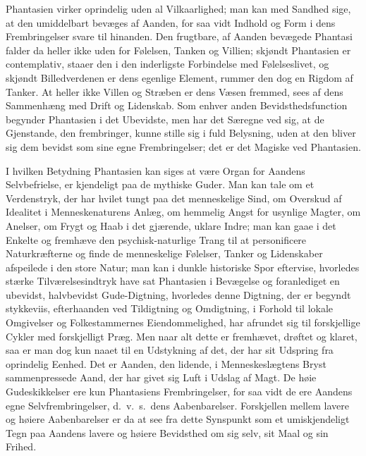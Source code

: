 \documentclass[12pt]{book}
\newcommand{\apage}[1]{\marginnote{\footnotesize\textit{[#1]}}}
\begin{document}
Phantasien virker oprindelig uden al Vilkaarlighed; man kan med Sandhed sige,
at den umiddelbart bevæges af Aanden, for saa vidt Indhold og Form i dens
Frembringelser svare til hinanden. Den  \apage{247} frugtbare, af Aanden bevægede Phantasi
falder da heller ikke uden for Følelsen, Tanken og Villien; skjøndt
Phantasien er contemplativ, staaer den i den inderligste Forbindelse med
Følelseslivet, og skjøndt Billedverdenen er dens egenlige Element, rummer den
dog en Rigdom af Tanker. At heller ikke Villen og Stræben er dens Væsen
fremmed, sees af dens Sammenhæng med Drift og Lidenskab. Som enhver anden
Bevidsthedsfunction begynder Phantasien i det Ubevidste, men har det Særegne
ved sig, at de Gjenstande, den frembringer, kunne stille sig i fuld
Belysning, uden at den bliver sig dem bevidst som sine egne Frembringelser;
det er det Magiske ved Phantasien.

I hvilken Betydning Phantasien kan siges at være Organ for Aandens
Selvbefrielse, er kjendeligt paa de mythiske Guder. Man kan tale om et
Verdenstryk, der har hvilet tungt paa det menneskelige Sind, om Overskud af
Idealitet i Menneskenaturens Anlæg, om hemmelig Angst for usynlige Magter, om
Anelser, om Frygt og Haab i det gjærende, uklare Indre; man kan gaae i det
Enkelte og fremhæve den psychisk-naturlige Trang til at personificere
Naturkræfterne og finde de menneskelige Følelser, Tanker og Lidenskaber
afspeilede i den store Natur; man kan i dunkle historiske Spor eftervise,
hvorledes stærke Tilværelsesindtryk have sat Phantasien i Bevægelse og
foranlediget en ubevidst, halvbevidst Gude-Digtning, hvorledes denne Digtning,
der er begyndt stykkeviis, efterhaanden ved Tildigtning og Omdigtning, i
Forhold til lokale Omgivelser og Folkestammernes Eiendommelighed, har \apage{248} afrundet
sig til forskjellige Cykler med forskjelligt Præg. Men naar alt dette er
fremhævet, drøftet og klaret, saa er man dog kun naaet til en Udstykning af
det, der har sit Udspring fra oprindelig Eenhed. Det er Aanden, den lidende,
i Menneskeslægtens Bryst sammenpressede Aand, der har givet sig Luft i Udslag
af Magt. De høie Gudeskikkelser ere kun Phantasiens Frembringelser, for saa
vidt de ere Aandens egne Selvfrembringelser, d.\ v.\ s.\ dens Aabenbarelser.
Forskjellen mellem lavere og høiere Aabenbarelser er da at see fra dette
Synspunkt som et umiskjendeligt Tegn paa Aandens lavere og høiere Bevidsthed
om sig selv, sit Maal og sin Frihed.
\end{document}
